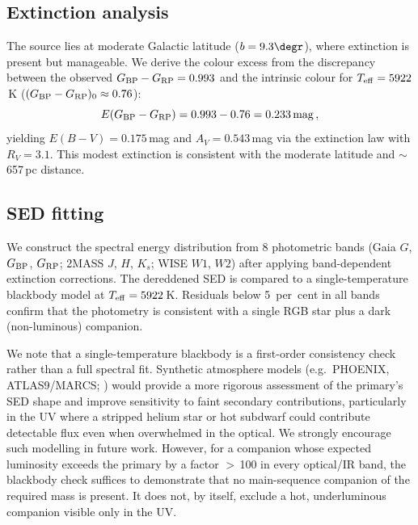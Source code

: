 \documentclass[usenatbib,fleqn]{mnras}
\begin{document}
\subsection{Extinction analysis}
\label{sec:methods:extinction}

The source lies at moderate Galactic latitude ($b = 9.3\degr$),
where extinction is present but manageable.  We derive the colour
excess from the discrepancy between the observed
$G_{\rm BP} - G_{\rm RP} = 0.993$ and the intrinsic colour for
$T_{\rm eff} = 5922$\,K
($(G_{\rm BP} - G_{\rm RP})_0 \approx 0.76$):
\begin{equation}
E(G_{\rm BP} - G_{\rm RP}) = 0.993 - 0.76 = 0.233\,{\rm mag} \,,
\end{equation}
yielding $E(B-V) = 0.175$\,mag and
$A_V = 0.543$\,mag via the \citet{Cardelli1989} extinction law
with $R_V = 3.1$.  This modest extinction is consistent with the
moderate latitude and $\sim$657\,pc distance.

\subsection{SED fitting}
\label{sec:methods:sed}

We construct the spectral energy distribution from 8 photometric
bands (Gaia $G$, $G_{\rm BP}$, $G_{\rm RP}$; 2MASS $J$, $H$,
$K_s$; WISE $W1$, $W2$) after applying band-dependent extinction
corrections.  The dereddened SED is compared to a single-temperature
blackbody model at $T_{\rm eff} = 5922$\,K.  Residuals below
5~per~cent in all bands confirm that the photometry is consistent
with a single RGB star plus a dark (non-luminous) companion.

We note that a single-temperature blackbody is a first-order
consistency check rather than a full spectral fit.  Synthetic
atmosphere models (e.g.\ PHOENIX, ATLAS9/MARCS;
\citealt{Husser2013,Castelli2003}) would provide a more rigorous
assessment of the primary's SED shape and improve sensitivity to
faint secondary contributions, particularly in the UV where a
stripped helium star or hot subdwarf could contribute detectable
flux even when overwhelmed in the optical.  We strongly encourage
such modelling in future work.  However, for a companion whose
expected luminosity exceeds the primary by a factor $>$\,100 in
every optical/IR band, the blackbody check suffices to
demonstrate that no main-sequence companion of the required mass
is present.  It does not, by itself, exclude a hot, underluminous
companion visible only in the UV.
\end{document}
